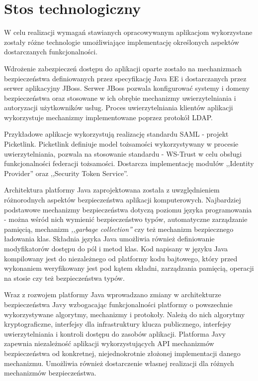 \chapter{Stos technologiczny}
\label{cha:stosTechnologiczny}

{\it

W celu realizacji wymagań stawianych opracowywanym aplikacjom wykorzystane zostały różne technologie umożliwiające implementację określonych aspektów dostarczanych funkcjonalności.

Wdrożenie zabezpieczeń dostępu do aplikacji oparte zostało na mechanizmach bezpieczeństwa definiowanych przez specyfikację Java EE i dostarczanych przez serwer aplikacyjny JBoss. Serwer JBoss pozwala konfigurować systemy i domeny bezpieczeństwa oraz stosowane w ich obrębie mechanizmy uwierzytelniania i autoryzacji użytkowników usług. Proces uwierzytelniania klientów aplikacji wykorzystuje mechanizmy implementowane poprzez protokół LDAP. 

Przykładowe aplikacje wykorzystują realizację standardu SAML - projekt Picketlink. Picketlink definiuje model tożsamości wykorzystywany w procesie uwierzytelniania, pozwala na stosowanie standardu - WS-Trust w celu obsługi funkcjonalności federacji tożsamości. Dostarcza implementację modułów ,,Identity Provider'' oraz ,,Security Token Service''. 

}

\label{sec:javaSE}

	Architektura platformy Java zaprojektowana została z uwzględnieniem różnorodnych aspektów bezpieczeństwa aplikacji komputerowych. Najbardziej podstawowe mechanizmy bezpieczeństwa dotyczą poziomu języka programowania - można wśród nich wymienić bezpieczeństwo typów, automatyczne zarządzanie pamięcią, mechanizm \textit{,,garbage collection''} czy też mechanizm bezpiecznego ładowania klas. Składnia języka Java umożliwia również definiowanie modyfikatorów dostępu do pól i metod klas. Kod napisany w języku Java kompilowany jest do niezależnego od platformy kodu bajtowego, który przed wykonaniem weryfikowany jest pod kątem składni, zarządzania pamięcią, operacji na stosie czy też bezpieczeństwa typów\cite{Oracle13}.

	Wraz z rozwojem platformy Java wprowadzano zmiany w architekturze bezpieczeństwa Javy wzbogacając funkcjonalności platformy o powszechnie wykorzystywane algorytmy, mechanizmy i protokoły. Należą do nich algorytmy kryptograficzne, interfejsy dla infrastruktury klucza publicznego, interfejsy uwierzytelniania i kontroli dostępu do zasobów aplikacji. Platforma Javy zapewnia niezależność aplikacji wykorzystujących API mechanizmów bezpieczeństwa od konkretnej, niejednokrotnie złożonej implementacji danego mechanizmu. Umożliwia również dostarczenie własnej realizacji dla różnych mechanizmów bezpieczeństwa.

